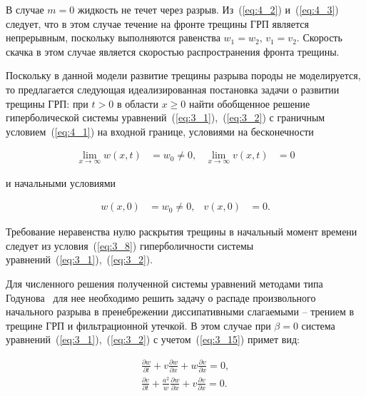 В случае $m = 0$ жидкость не течет через разрыв. Из~(\ref{eq:4_2}) и~(\ref{eq:4_3}) следует, что в этом случае течение на фронте трещины ГРП является непрерывным, поскольку выполняются равенства $w_1 =w_2, \, v_1 = v_2$. Скорость скачка в этом случае является скоростью распространения фронта трещины.



Поскольку в данной модели развитие трещины разрыва породы не моделируется, то предлагается следующая идеализированная постановка задачи о развитии трещины ГРП: при $t>0$ в области $x \geq 0$  найти обобщенное решение~\cite{rozhd1} гиперболической системы уравнений~(\ref{eq:3_1}),~(\ref{eq:3_2}) с граничным условием~(\ref{eq:4_1}) на входной границе, условиями на бесконечности

\begin{align}

\lim\limits_{x\to \infty} w\left(x,t\right) &= w_0 \neq 0, &\lim\limits_{x\to \infty} v\left(x,t\right) &= 0  \nonumber

\end{align}

и начальными условиями

\begin{align}

w\left(x,0\right) &= w_0 \neq 0, & v\left(x,0\right) &= 0 . \nonumber

\end{align}



Требование неравенства нулю раскрытия трещины в начальный момент времени следует из условия~(\ref{eq:3_8}) гиперболичности системы уравнений~(\ref{eq:3_1}),~(\ref{eq:3_2}).




Для численного решения полученной системы уравнений методами типа Годунова~\cite{kulik1} для нее необходимо решить задачу о распаде произвольного начального разрыва в пренебрежении диссипативными слагаемыми – трением в трещине ГРП и фильтрационной утечкой. В этом случае при $\beta = 0$ система уравнений~(\ref{eq:3_1}),~(\ref{eq:3_2}) с учетом~(\ref{eq:3_15}) примет вид:

\begin{align}

\frac{\partial w}{\partial t} + v\frac{\partial w}{\partial x}+w\frac{\partial v}{\partial x} =0, \label{eq:5_1} \\

\frac{\partial v}{\partial t} + \frac{a^2}{w}\frac{\partial w}{\partial x}+v\frac{\partial v}{\partial x} =0. \label{eq:5_2}

\end{align}



